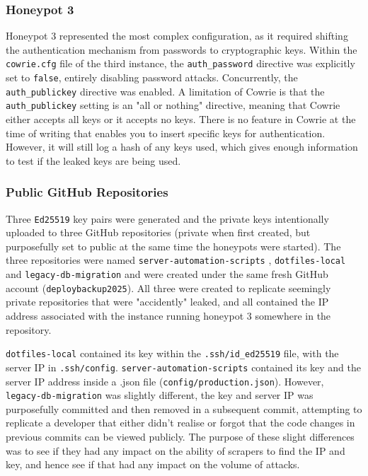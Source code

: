 \documentclass[]{article}
\begin{document}
\subsubsection{Honeypot 3}

Honeypot 3 represented the most complex configuration, as it required shifting the authentication mechanism from passwords to cryptographic keys. Within the \texttt{cowrie.cfg} file of the third instance, the \texttt{auth\_password} directive was explicitly set to \texttt{false}, entirely disabling password attacks. Concurrently, the \texttt{auth\_publickey} directive was enabled. A limitation of Cowrie is that the \texttt{auth\_publickey} setting is an "all or nothing" directive, meaning that Cowrie either accepts all keys or it accepts no keys. There is no feature in Cowrie at the time of writing that enables you to insert specific keys for authentication. However, it will still log a hash of any keys used, which gives enough information to test if the leaked keys are being used.

\subsubsection{Public GitHub Repositories}

Three \texttt{Ed25519} key pairs were generated and the private keys intentionally uploaded to three GitHub repositories (private when first created, but purposefully set to public at the same time the honeypots were started). The three repositories were named \texttt{server-automation-scripts} \cite{server-automation-scripts}, \texttt{dotfiles-local} \cite{dotfiles-local} and \texttt{legacy-db-migration} \cite{legacy-db-migration} and were created under the same fresh GitHub account \newline(\texttt{deploybackup2025}). All three were created to replicate seemingly private repositories that were "accidently" leaked, and all contained the IP address associated with the instance running honeypot 3 somewhere in the repository. 

\texttt{dotfiles-local} contained its key within the \texttt{.ssh/id\_ed25519} file, with the server IP in \texttt{.ssh/config}. \texttt{server-automation-scripts} contained its key and the server IP address inside a .json file \newline(\texttt{config/production.json}). However, \texttt{legacy-db-migration} was slightly different, the key and server IP was purposefully committed and then removed in a subsequent commit, attempting to replicate a developer that either didn't realise or forgot that the code changes in previous commits can be viewed publicly. The purpose of these slight differences was to see if they had any impact on the ability of scrapers to find the IP and key, and hence see if that had any impact on the volume of attacks.
\end{document}

